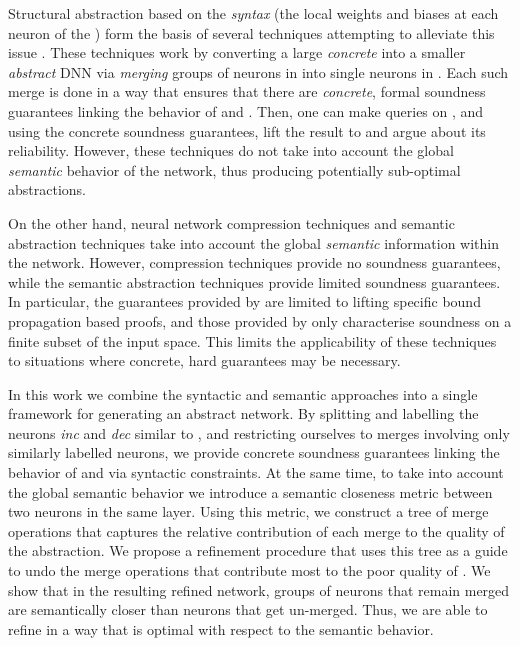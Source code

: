 Structural abstraction based on the \textit{syntax} (the local weights and
biases at each neuron of the \dnn) form the basis of several techniques
attempting to alleviate this issue \cite{cegar-nn, cegarette, cleverest-nn,
conv-abs-gk}. These techniques work by converting a large \textit{concrete}
\dnn \cnc into a smaller \textit{abstract} DNN \abs via \textit{merging} groups
of neurons in \cnc into single neurons in \abs. Each such merge is done in a
way that ensures that there are \textit{concrete}, formal soundness guarantees
linking the behavior of \cnc and \abs. Then, one can make queries on \abs, and
using the concrete soundness guarantees, lift the result to \cnc and argue
about its reliability. However, these techniques do not take into account the
global \textit{semantic} behavior of the network, thus producing potentially
sub-optimal abstractions.

On the other hand, neural network compression techniques \cite{dnn-compression}
and semantic abstraction techniques \cite{deep-abstract, lin-comb-abs-jan} take
into account the global \textit{semantic} information within the network.
However, compression techniques provide no soundness guarantees, while the
semantic abstraction techniques provide limited soundness guarantees. In
particular, the guarantees provided by \cite{deep-abstract} are limited to
lifting specific bound propagation based proofs, and those provided by
\cite{lin-comb-abs-jan} only characterise soundness on a finite subset of the
input space. This limits the applicability of these techniques to situations
where concrete, hard guarantees may be necessary.

In this work we combine the syntactic and semantic approaches into a single
framework for generating an abstract network. By splitting and labelling the
neurons \textit{inc} and \textit{dec} similar to \cite{cegar-nn}, and
restricting ourselves to merges involving only similarly labelled neurons, we
provide concrete soundness guarantees linking the behavior of \cnc and \abs via
syntactic constraints. At the same time, to take into account the global
semantic behavior we introduce a semantic closeness metric between two neurons
in the same layer.  Using this metric, we construct a tree of merge operations
that captures the relative contribution of each merge to the quality of the
abstraction. We propose a refinement procedure that uses this tree as a guide
to undo the merge operations that contribute most to the poor quality of \abs.
We show that in the resulting refined network, groups of neurons that remain
merged are semantically closer than neurons that get un-merged. Thus, we are
able to refine \abs in a way that is optimal with respect to the semantic
behavior.

